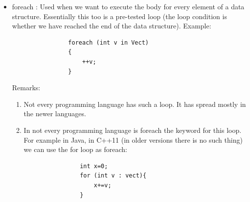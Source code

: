 \documentclass[margin=0px]{article}
\begin{document}
\begin{itemize}
\begin{itemize}
                    Example (C++):

                    \begin{verbatim}
                int i=0;
                do
                {
                    ++i;
                } while(i<5);
            \end{verbatim}

                    Remark: there are languages (e.g. Pascal) in which the condition of the post-tested loop is not a staying-in but a
                    stopping condition. That is, we do not specify what has to hold for the loop body to be executed once more,
                    but what has to hold for the loop body not to be executed any more.

                    The Pascal counterpart of the previous C++ example:
                    \begin{verbatim}
                i:=0;
                repeat
                    i:=i+1;
                until i=5;
            \end{verbatim}

                    Remark: in ADA there is no real post-tested loop. In this language we can write a post-tested loop by
                    writing a loop without a condition whose last statement is a condition-bound exit.

                    Example:
                    \begin{verbatim}
                i:=0;
                loop
                    i:=i+1;
                    exit when i=5;
                end loop;
            \end{verbatim}


              \item	foreach : Used when we want to execute the body for every element of a data structure.
                    Essentially this too is a pre-tested loop (the loop condition is whether we have reached the end of the
                    data structure).
                    Example:
                    \begin{verbatim}
                foreach (int v in Vect)
                {
                    ++v;
                }
            \end{verbatim}

                    Remarks:
                    \begin{enumerate}
                        \item	Not every programming language has such a loop. It has spread mostly in the newer languages.
                        \item	In not every programming language is foreach the keyword for this loop.
                              For example in Java, in C++11 (in older versions there is no such thing) we can use the for loop as foreach:
                              \begin{verbatim}
                int x=0;
                for (int v : vect){
                    x+=v;
                }
                \end{verbatim}
                    \end{enumerate}


\end{itemize}
\end{itemize}
\end{document}
